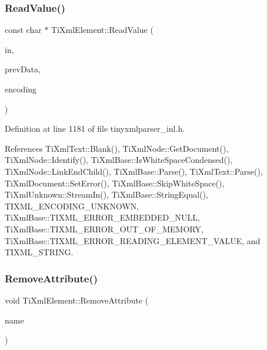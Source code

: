 \hypertarget{class_ti_xml_element_ac786bce103042d3837c4cc2ff6967d41}{}\label{class_ti_xml_element_ac786bce103042d3837c4cc2ff6967d41} 
\subsubsection{\texorpdfstring{Read\+Value()}{ReadValue()}}
{\footnotesize\ttfamily const char $\ast$ Ti\+Xml\+Element\+::\+Read\+Value (\begin{DoxyParamCaption}\item[{const char $\ast$}]{in,  }\item[{\hyperlink{class_ti_xml_parsing_data}{Ti\+Xml\+Parsing\+Data} $\ast$}]{prev\+Data,  }\item[{\hyperlink{tinyxml_8h_a88d51847a13ee0f4b4d320d03d2c4d96}{Ti\+Xml\+Encoding}}]{encoding }\end{DoxyParamCaption})\hspace{0.3cm}{\ttfamily [protected]}}



Definition at line 1181 of file tinyxmlparser\+\_\+inl.\+h.



References Ti\+Xml\+Text\+::\+Blank(), Ti\+Xml\+Node\+::\+Get\+Document(), Ti\+Xml\+Node\+::\+Identify(), Ti\+Xml\+Base\+::\+Is\+White\+Space\+Condensed(), Ti\+Xml\+Node\+::\+Link\+End\+Child(), Ti\+Xml\+Base\+::\+Parse(), Ti\+Xml\+Text\+::\+Parse(), Ti\+Xml\+Document\+::\+Set\+Error(), Ti\+Xml\+Base\+::\+Skip\+White\+Space(), Ti\+Xml\+Unknown\+::\+Stream\+In(), Ti\+Xml\+Base\+::\+String\+Equal(), T\+I\+X\+M\+L\+\_\+\+E\+N\+C\+O\+D\+I\+N\+G\+\_\+\+U\+N\+K\+N\+O\+WN, Ti\+Xml\+Base\+::\+T\+I\+X\+M\+L\+\_\+\+E\+R\+R\+O\+R\+\_\+\+E\+M\+B\+E\+D\+D\+E\+D\+\_\+\+N\+U\+LL, Ti\+Xml\+Base\+::\+T\+I\+X\+M\+L\+\_\+\+E\+R\+R\+O\+R\+\_\+\+O\+U\+T\+\_\+\+O\+F\+\_\+\+M\+E\+M\+O\+RY, Ti\+Xml\+Base\+::\+T\+I\+X\+M\+L\+\_\+\+E\+R\+R\+O\+R\+\_\+\+R\+E\+A\+D\+I\+N\+G\+\_\+\+E\+L\+E\+M\+E\+N\+T\+\_\+\+V\+A\+L\+UE, and T\+I\+X\+M\+L\+\_\+\+S\+T\+R\+I\+NG.

\hypertarget{class_ti_xml_element_a56979767deca794376b1dfa69a525b2a}{}\label{class_ti_xml_element_a56979767deca794376b1dfa69a525b2a} 
\subsubsection{\texorpdfstring{Remove\+Attribute()}{RemoveAttribute()}\hspace{0.1cm}{\footnotesize\ttfamily [1/2]}}
{\footnotesize\ttfamily void Ti\+Xml\+Element\+::\+Remove\+Attribute (\begin{DoxyParamCaption}\item[{const char $\ast$}]{name }\end{DoxyParamCaption})}

